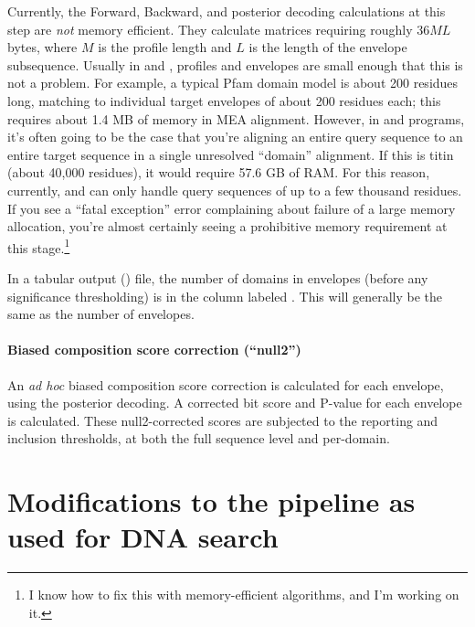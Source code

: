 Currently, the Forward, Backward, and posterior decoding calculations
at this step are \emph{not} memory efficient. They calculate matrices
requiring roughly $36 ML$ bytes, where $M$ is the profile length and
$L$ is the length of the envelope subsequence. Usually in
 and , profiles and envelopes are small
enough that this is not a problem. For example, a typical Pfam domain
model is about 200 residues long, matching to individual target
envelopes of about 200 residues each; this requires about 1.4 MB of
memory in MEA alignment. However, in  and
 programs, it's often going to be the case that you're
aligning an entire query sequence to an entire target sequence in a
single unresolved ``domain'' alignment. If this is titin (about 40,000
residues), it would require 57.6 GB of RAM. For this reason,
currently,  and  can only handle query
sequences of up to a few thousand residues. If you see a ``fatal
exception'' error complaining about failure of a large memory
allocation, you're almost certainly seeing a prohibitive memory
requirement at this stage.\footnote{I know how to fix this with
  memory-efficient algorithms, and I'm working on it.}

In a tabular output () file, the number of domains in
envelopes (before any significance thresholding) is in the column
labeled . This will generally be the same as the number of
envelopes.

\paragraph{Biased composition score correction (``null2'')}
An \emph{ad hoc} biased composition score correction is calculated for
each envelope, using the posterior decoding. A corrected bit score and
P-value for each envelope is calculated. These null2-corrected scores
are subjected to the reporting and inclusion thresholds, at both the full
sequence level and per-domain.




\section{Modifications to the pipeline as used for DNA search}

